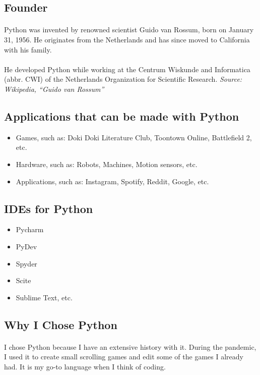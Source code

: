 \documentclass{article}
\begin{document}
	\subsection*{Founder}
	\paragraph{}Python was invented by renowned scientist Guido van Rossum, born on January 31, 1956.
	He originates from the Netherlands and has since moved to California with his family.
	\paragraph{}He developed Python while working at the Centrum Wiskunde and Informatica (abbr. CWI) of the Netherlands Organization for Scientific Research.
	\textit{Source: Wikipedia, “Guido van Rossum”}
	\subsection*{Applications that can be made with Python}
	\begin{itemize}
		\item Games, such as: Doki Doki Literature Club, Toontown Online, Battlefield 2, etc.
		\item Hardware, such as: Robots, Machines, Motion sensors, etc.
		\item Applications, such as: Instagram, Spotify, Reddit, Google, etc.
	\end{itemize}
	\subsection*{IDEs for Python}
	\begin{itemize}
		\item Pycharm
		\item PyDev
		\item Spyder
		\item Scite
		\item Sublime Text, etc.
	\end{itemize}
	\subsection*{Why I Chose Python}
	\paragraph{}I chose Python because I have an extensive history with it.
	During the pandemic, I used it to create small scrolling games and edit some of the games I already had.
	It is my go-to language when I think of coding.
\end{document}

